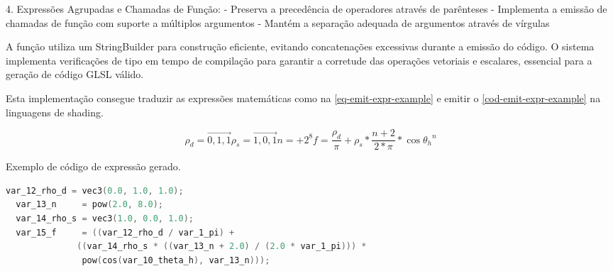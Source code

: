 4. Expressões Agrupadas e Chamadas de Função:
   - Preserva a precedência de operadores através de parênteses
   - Implementa a emissão de chamadas de função com suporte a múltiplos argumentos
   - Mantém a separação adequada de argumentos através de vírgulas

A função utiliza um StringBuilder para construção eficiente, evitando concatenações excessivas durante a emissão do código. O sistema implementa verificações de tipo em tempo de compilação para garantir a corretude das operações vetoriais e escalares, essencial para a geração de código GLSL válido.

Esta implementação consegue traduzir as expressões matemáticas como na \autoref{eq-emit-expr-example} e emitir o \autoref{cod-emit-expr-example} na linguagens de shading.

\begin{subequations}
\begin{equation}
    \rho_{d} = \vec{0,1,1}
\end{equation}

\begin{equation}
    \rho_{s} = \vec{1,0,1}
\end{equation}

\begin{equation}
    n = +2^8
\end{equation}

\begin{equation}
f = \frac{\rho_{d}}{\pi} + \rho_{s} * \frac{n+2}{2*\pi} *
\cos{\theta_{h}}^{n}
\end{equation}
\end{subequations}

\begin{codigo}[htb]
   \caption{\small Exemplo de código de expressão gerado. }
   \label{cod-emit-expr-example}
\begin{lstlisting}[language=C, frame=none, inputencoding=utf8]
  var_12_rho_d = vec3(0.0, 1.0, 1.0);
  var_13_n     = pow(2.0, 8.0);
  var_14_rho_s = vec3(1.0, 0.0, 1.0);
  var_15_f     = ((var_12_rho_d / var_1_pi) +
              ((var_14_rho_s * ((var_13_n + 2.0) / (2.0 * var_1_pi))) *
               pow(cos(var_10_theta_h), var_13_n)));
\end{lstlisting}
\end{codigo}

